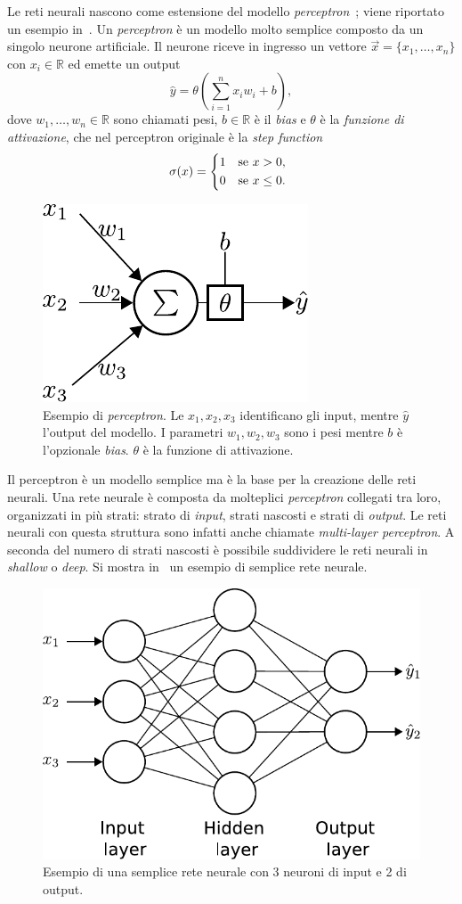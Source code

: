 Le reti neurali nascono come estensione del modello \emph{perceptron}~\cite{1958_perceptron}; viene riportato un esempio in~.
Un \emph{perceptron} è un modello molto semplice composto da un singolo neurone artificiale.
Il neurone riceve in ingresso un vettore $\Vec{x}=\{x_1,\dots,x_n\}$ con $x_i \in \mathbb{R}$ ed emette un output 
\begin{equation*}
    \hat{y} = \theta\left(\sum_{i=1}^{n}x_iw_i +b\right),
\end{equation*} 
dove $w_1,\dots,w_n \in \mathbb{R}$ sono chiamati pesi, $b \in \mathbb{R}$ è il \emph{bias} e $\theta$ è la \emph{funzione di attivazione}, che nel perceptron originale è la \emph{step function} 
\begin{equation*}
    \sigma(x) =
    \begin{cases*}
      1 & se $x>0$, \\
      0 & se $x\leq0$.
    \end{cases*}
\end{equation*}
\begin{figure}
    \centering
    \includegraphics[width=0.5\linewidth]{img/perceptron.pdf}
    \caption{Esempio di \emph{perceptron}. Le $x_1,x_2,x_3$ identificano gli input, mentre $\hat{y}$ l'output del modello. I parametri $w_1,w_2,w_3$ sono i pesi mentre $b$ è l'opzionale \emph{bias}. $\theta$ è la funzione di attivazione.}
    \label{fig:perceptron}
\end{figure}
Il perceptron è un modello semplice ma è la base per la creazione delle reti neurali.
Una rete neurale è composta da molteplici \emph{perceptron} collegati tra loro, organizzati in più strati: strato di \emph{input}, strati nascosti e strati di \emph{output}.
Le reti neurali con questa struttura sono infatti anche chiamate \emph{multi-layer perceptron}.
A seconda del numero di strati nascosti è possibile suddividere le reti neurali in \emph{shallow} o \emph{deep}.
Si mostra in~ un esempio di semplice rete neurale. 
\begin{figure}
    \centering
    \includegraphics[width=0.5\linewidth]{img/nn.pdf}
    \caption{Esempio di una semplice rete neurale con 3 neuroni di input e 2 di output.}
    \label{fig:NN}
\end{figure}
